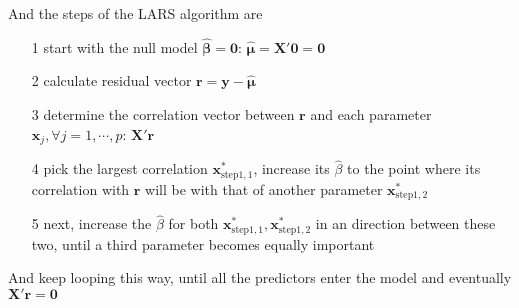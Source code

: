 \documentclass[twoside]{article}
\begin{document}
\begin{figure}[ht]
\begin{minipage}[b]{0.45\textwidth}
    \end{minipage}
\end{figure}

And the steps of the LARS algorithm are
\begin{itemize}
    \item[1] start with the null model $\hat{\boldsymbol{\beta}}=\mathbf{0}$: $\hat{\boldsymbol{\mu}} = \mathbf{X}'\mathbf{0}=\mathbf{0}$ 
    \item[2] calculate residual vector $\mathbf{r} = \mathbf{y}-\hat{\boldsymbol{\mu}}$
    \item[3] determine the correlation vector between $\mathbf{r}$ and each parameter $\mathbf{x}_j,\forall j=1,\cdots,p$: $\mathbf{X}'\mathbf{r}$
    \item[4] pick the largest correlation $\mathbf{x}^*_{\text{step}1,1}$, increase its $\hat{{\beta}}$ to the point where its correlation with $\mathbf{r}$ will be  with that of another parameter $\mathbf{x}^*_{\text{step1},2}$ 
    \item[5] next, increase the $\hat{\beta}$ for both $\mathbf{x}^*_{\text{step1},1},\mathbf{x}^*_{\text{step1},2}$ in an  direction between these two, until a third parameter becomes equally important
\end{itemize}
And keep looping this way, until all the predictors enter the model and eventually $\mathbf{X}'\mathbf{r}=\mathbf{0}$
\end{document}
